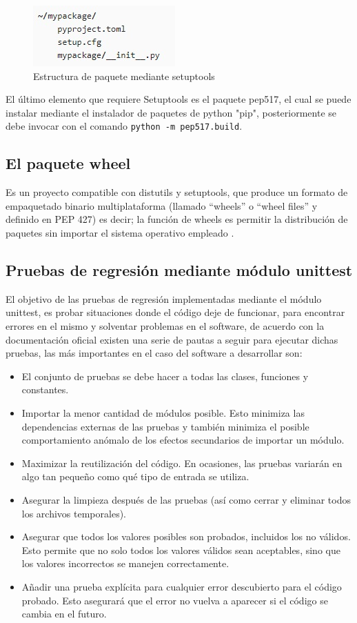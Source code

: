 \begin{figure}[H]
    \centering
    \includegraphics{Recursos/estructuraSetupTools.jpg}
    \caption{Estructura de paquete mediante setuptools}
    \label{estructuraSetupTools}
\end{figure}
El último elemento que requiere Setuptools es el paquete pep517, el cual se puede instalar mediante el instalador de paquetes de python "pip", posteriormente se debe invocar con el comando \texttt{python -m pep517.build}.
\subsection{El paquete wheel}
Es un proyecto compatible con distutils y setuptools, que produce un formato de empaquetado binario multiplataforma (llamado ``wheels'' o ``wheel files'' y definido en PEP 427) es decir; la función de wheels es permitir la distribución de paquetes sin importar el sistema operativo empleado \cite{wheel}.
\subsection{Pruebas de regresión mediante módulo unittest}
El objetivo de las pruebas de regresión implementadas mediante el módulo unittest, es probar situaciones donde el código deje de funcionar, para encontrar errores en el mismo y solventar problemas en el software, de acuerdo con la documentación oficial existen una serie de pautas a seguir para ejecutar dichas pruebas, las más importantes en el caso del software a desarrollar son:
\begin{itemize}
    \item El conjunto de pruebas se debe hacer a todas las clases, funciones y constantes.
    \item Importar la menor cantidad de módulos posible. Esto minimiza las dependencias externas de las pruebas y también minimiza el posible comportamiento anómalo de los efectos secundarios de importar un módulo.
    \item Maximizar la reutilización del código. En ocasiones, las pruebas variarán en algo tan pequeño como qué tipo de entrada se utiliza.
    \item Asegurar la limpieza después de las pruebas (así como cerrar y eliminar todos los archivos temporales).
    \item Asegurar que todos los valores posibles son probados, incluidos los no válidos. Esto permite que no solo todos los valores válidos sean aceptables, sino que los valores incorrectos se manejen correctamente.
    \item Añadir una prueba explícita para cualquier error descubierto para el código probado. Esto asegurará que el error no vuelva a aparecer si el código se cambia en el futuro.
\end{itemize}
